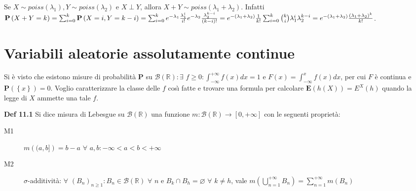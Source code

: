 \documentclass{article}
\begin{document}
\begin{description}
\item Se $X\sim poiss\left( \lambda _{1}\right) ,Y\sim poiss\left( \lambda
_{2}\right) $ e $X\perp Y$, allora $X+Y\sim poiss\left( \lambda _{1}+\lambda
_{2}\right) $. Infatti $\mathbf{P}\left( X+Y=k\right) =\sum_{i=0}^{k}\mathbf{%
P}\left( X=i,Y=k-i\right) =\sum_{i=0}^{k}e^{-\lambda _{1}}\frac{\lambda
_{1}^{i}}{i!}e^{-\lambda _{2}}\frac{\lambda _{2}^{k-i}}{\left( k-i\right) !}%
=e^{-\left( \lambda _{1}+\lambda _{2}\right) }\frac{1}{k!}\sum_{i=0}^{k}%
\binom{k}{i}\lambda _{1}^{i}\lambda _{2}^{k-i}=e^{-\left( \lambda
_{1}+\lambda _{2}\right) }\frac{\left( \lambda _{1}+\lambda _{2}\right) ^{k}%
}{k!}$.
\end{description}

\section{Variabili aleatorie assolutamente continue}

Si \`{e} visto che esistono misure di probabilit\`{a} $\mathbf{P}$ su $%
\mathcal{B}\left( 
\mathbb{R}
\right) :\exists $ $f\geq 0:\int_{-\infty }^{+\infty }f\left( x\right) dx=1$
e $F\left( x\right) =\int_{-\infty }^{x}f\left( x\right) dx$, per cui $F$ 
\`{e} continua e $\mathbf{P}\left( \left\{ x\right\} \right) =0$. Voglio
caratterizzare la classe delle $f$ cos\`{\i} fatte e trovare una formula per
calcolare $\mathbf{E}\left( h\left( X\right) \right) =E^{X}\left( h\right) $
quando la legge di $X$ ammette una tale $f$.

\textbf{Def 11.1} Si dice misura di Lebesgue su $\mathcal{B}\left( 
\mathbb{R}
\right) $ una funzione $m:\mathcal{B}\left( 
\mathbb{R}
\right) \rightarrow \left[ 0,+\infty \right] $ con le seguenti propriet\`{a}:

\begin{description}
\item[M1] $m\left( (a,b]\right) =b-a$ $\forall $ $a,b:-\infty <a<b<+\infty $

\item[M2] $\sigma $-additivit\`{a}: $\forall $ $\left( B_{n}\right) _{n\geq
1}:B_{n}\in \mathcal{B}\left( 
\mathbb{R}
\right) $ $\forall $ $n$ e $B_{k}\cap B_{h}=\varnothing $ $\forall $ $k\neq
h $, vale $m\left( \bigcup_{n=1}^{+\infty }B_{n}\right) =\sum_{n=1}^{+\infty
}m\left( B_{n}\right) $
\end{description}
\end{document}
